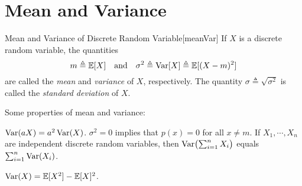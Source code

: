 \documentclass[../probability.tex]{subfiles}
\begin{document}
\section{Mean and Variance}

\begin{Definition}{Mean and Variance of Discrete Random Variable}[meanVar]
    If \(X\) is a discrete random variable, the quantities
    \[
        m \triangleq \mathbb{E}[X]\quad\text{and}\quad
        \sigma^2 \triangleq \operatorname{Var}[X] \triangleq \mathbb{E}[(X - m)^2]
    \]
    are called the \emph{mean} and \emph{variance} of \(X\), respectively.
    The quantity \(\sigma \triangleq \sqrt{\sigma^2}\) is called the
    \emph{standard deviation} of \(X\).
\end{Definition}

\begin{note}
    Some properties of mean and variance:
    \begin{itemize}
        \ii
        \(\operatorname{Var}(aX) = a^2 \operatorname{Var}(X)\).
        \ii
        \(\sigma^2 = 0\) implies that
        \(p(x) = 0\) for all \(x \neq m\).
        \ii
        If \(X_1, \cdots, X_n\) are independent discrete random variables,
        then \(\operatorname{Var} \bigl( \sum_{i=1}^n X_i \bigr)\) equals \(\sum_{i=1}^n \operatorname{Var}(X_i)\).

        \ii
        \(\operatorname{Var}(X) = \mathbb{E}[X^2] - \mathbb{E}[X]^2\).
    \end{itemize}
\end{note}
\end{document}
